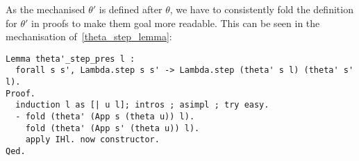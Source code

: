As the mechanised $\theta'$ is defined after $\theta$, we have to consistently fold the definition for $\theta'$ in proofs to make them goal more readable.
This can be seen in the mechanisation of~\cref{theta_step_lemma}:
\begin{lstlisting}[language=Coq]
Lemma theta'_step_pres l :
  forall s s', Lambda.step s s' -> Lambda.step (theta' s l) (theta' s' l).
Proof.
  induction l as [| u l]; intros ; asimpl ; try easy.
  - fold (theta' (App s (theta u)) l).
    fold (theta' (App s' (theta u)) l).
    apply IHl. now constructor.
Qed.
\end{lstlisting}



